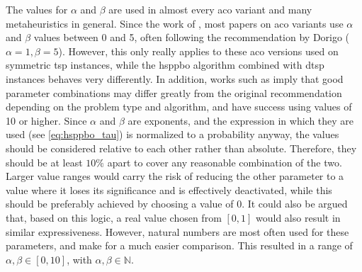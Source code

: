 The values for $\alpha$ and $\beta$ are used in almost every \gls{aco} variant and many metaheuristics in general. Since the work of \cite{dorigo1996ant}, most papers on \gls{aco} variants use $\alpha$ and $\beta$ values between 0 and 5, often following the recommendation by Dorigo ($\alpha = 1, \beta = 5$). However, this only really applies to these \gls{aco} versions used on symmetric \gls{tsp} instances, while the \gls{hsppbo} algorithm combined with \gls{dtsp} instances behaves very differently. In addition, works such as \cite{stutzle2012parameter, tuani2018h, wong2008parameter} imply that good parameter combinations may differ greatly from the original recommendation depending on the problem type and algorithm, and have success using values of 10 or higher. Since $\alpha$ and $\beta$ are exponents, and the expression in which they are used (see \cref{eq:hsppbo_tau}) is normalized to a probability anyway, the values should be considered relative to each other rather than absolute. Therefore, they should be at least $10\%$ apart to cover any reasonable combination of the two. Larger value ranges would carry the risk of reducing the other parameter to a value where it loses its significance and is effectively deactivated, while this should be preferably achieved by choosing a value of 0. It could also be argued that, based on this logic, a real value chosen from $[0,1]$ would also result in similar expressiveness. However, natural numbers are most often used for these parameters, and make for a much easier comparison. This resulted in a range of $\alpha,\beta \in [0,10]$, with $\alpha,\beta \in \mathbb{N}$.

